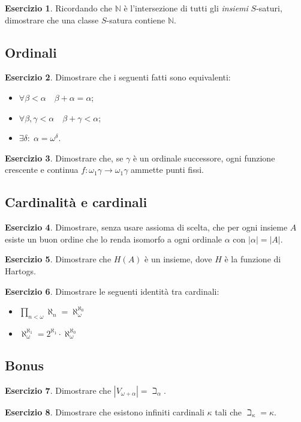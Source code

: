 \documentclass[a4paper,10pt,oneside]{article}
\newcommand{\abs}[1]{\left|#1\right|}
\theoremstyle{plain}
\theoremstyle{definition}
\newtheorem{myex}{Esercizio}
\theoremstyle{remark}
\begin{document}
\begin{myex}\label{ex:classisature}
 Ricordando che $\mathbb N$ è l'intersezione di tutti gli \emph{insiemi} $S$-saturi, dimostrare che una classe $S$-satura contiene $\mathbb N$.
\end{myex}



\subsection{Ordinali}

\begin{myex} Dimostrare che i seguenti fatti sono equivalenti:
\begin{itemize}
 \item $\forall \beta < \alpha \quad \beta + \alpha=\alpha$;
 \item $\forall \beta,\gamma <\alpha \quad \beta +\gamma <\alpha$;
 \item $\exists \delta: \; \alpha=\omega^\delta$.
\end{itemize}
\end{myex}

\begin{myex}\label{ex:puntifissi}
 Dimostrare che, se $\gamma$ è un ordinale successore, ogni funzione crescente e continua $f:\omega_1\gamma\rightarrow\omega_1\gamma$ ammette punti fissi.
\end{myex}


\subsection{Cardinalità e cardinali}
\begin{myex}
 Dimostrare, senza usare assioma di scelta, che per ogni insieme $A$ esiste un buon ordine che lo renda isomorfo a ogni ordinale $\alpha$ con $\abs\alpha=\abs A$.
\end{myex}
\begin{myex}\label{ex:Hart}
 Dimostrare che $H(A)$ è un insieme, dove $H$ è la funzione di Hartogs.
\end{myex}
\begin{myex}
 Dimostrare le seguenti identità tra cardinali:
 \begin{itemize}
  \item $\prod_{n<\omega}\aleph_n=\aleph_\omega^{\aleph_0}$
  \item $\aleph_\omega^{\aleph_1}=2^{\aleph_1}\cdot \aleph_\omega^{\aleph_0}$
 \end{itemize}
\end{myex}

\subsection{Bonus}

\begin{myex}
 Dimostrare che $\abs{V_{\omega+\alpha}}=\beth_\alpha$.
\end{myex}

\begin{myex}
 Dimostrare che esistono infiniti cardinali $\kappa$ tali che $\beth_\kappa=\kappa$.
\end{myex}
\end{document}
